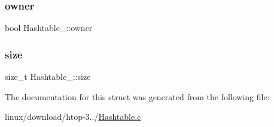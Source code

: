 \mbox{\label{structHashtable___a57e38588312b0f1a8805fd490f2da519}} 
\subsubsection{\texorpdfstring{owner}{owner}}
{\footnotesize\ttfamily bool Hashtable\+\_\+\+::owner}

\mbox{\label{structHashtable___adc6490e343a67bd23b655e3950dbb214}} 
\subsubsection{\texorpdfstring{size}{size}}
{\footnotesize\ttfamily size\+\_\+t Hashtable\+\_\+\+::size}



The documentation for this struct was generated from the following file\+:\begin{DoxyCompactItemize}
\item 
linux/download/htop-\/3../\hyperlink{Hashtable_8c}{Hashtable.\+c}\end{DoxyCompactItemize}
